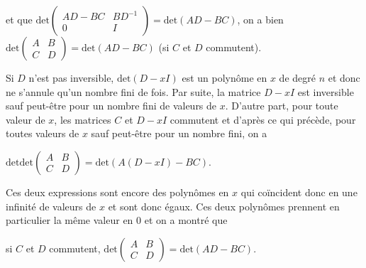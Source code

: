 {{et que $\text{det}\left(
\begin{array}{cc}
AD-BC&BD^{-1}\\
0&I
\end{array}
\right)=\text{det}(AD-BC)$, on a bien $\text{det}\left(
\begin{array}{cc}
A&B\\
C&D
\end{array}
\right)=\text{det}(AD-BC)$ (si $C$ et $D$ commutent).

Si $D$ n'est pas inversible, $\text{det}(D-xI)$ est un polynôme en $x$ de degré $n$ et donc ne s'annule qu'un nombre fini de fois. Par suite, la matrice $D-xI$ est inversible sauf peut-être pour un nombre fini de valeurs de $x$. D'autre part, pour toute valeur de $x$, les matrices $C$ et $D-xI$ commutent et d'après ce qui précède, pour toutes valeurs de $x$ sauf peut-être pour un nombre fini, on a

\begin{center}
$\text{det}\text{det}\left(
\begin{array}{cc}
A&B\\
C&D
\end{array}
\right)=\text{det}(A(D-xI)-BC)$.
\end{center}

Ces deux expressions sont encore des polynômes en $x$ qui coïncident donc en une infinité de valeurs de $x$ et sont donc égaux. Ces deux polynômes prennent en particulier la même valeur en $0$ et on a montré que

\begin{center}
si $C$ et $D$ commutent, $\text{det}\left(
\begin{array}{cc}
A&B\\
C&D
\end{array}
\right)=\text{det}(AD-BC)$.
\end{center}}
}